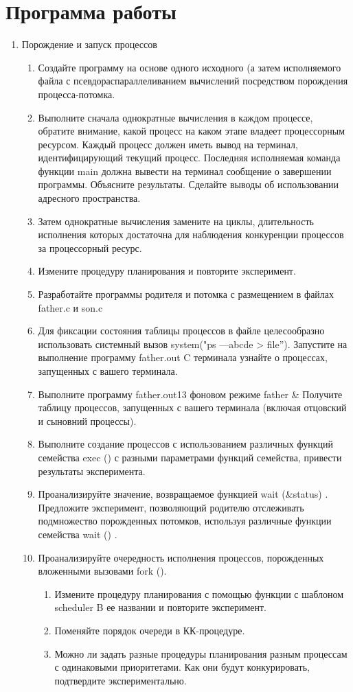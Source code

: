 \documentclass[a4paper]{article}
\begin{document}
\section{Программа работы}
\begin{enumerate}
	\item Порождение и запуск процессов
	\begin{enumerate}
		\item Создайте программу на основе одного исходного (а затем исполняемого файла с псевдораспараллеливанием вычислений посредством порождения процесса-потомка.
		\item Выполните сначала однократные вычисления в каждом процессе, обратите внимание, какой процесс на каком этапе владеет процессорным ресурсом. Каждый процесс должен иметь вывод на терминал, идентифицирующий текущий процесс. Последняя исполняемая команда функции main должна вывести на терминал сообщение о завершении программы. Объясните результаты. Сделайте выводы об использовании адресного пространства.
		\item Затем однократные вычисления замените на циклы, длительность исполнения которых достаточна для наблюдения конкуренции процессов за процессорный ресурс.
		\item Измените процедуру планирования и повторите эксперимент.
		\item Разработайте программы родителя и потомка с размещением в файлах father.c и son.c
		\item Для фиксации состояния таблицы процессов в файле целесообразно использовать системный вызов system("ps —abcde > file”). Запустите на выполнение программу father.out C терминала узнайте о процессах, запущенных с вашего терминала.
		\item Выполните программу father.out13 фоновом режиме father \& Получите таблицу процессов, запущенных с вашего терминала (включая отцовский и сыновний процессы).
		\item Выполните создание процессов с использованием различных функций семейства exec () с разными параметрами функций семейства, привести результаты эксперимента.
		\item Проанализируйте значение, возвращаемое функцией wait (\&status) . Предложите эксперимент, позволяющий родителю отслеживать подмножество порожденных потомков, используя различные функции семейства wait () .
		\item Проанализируйте очередность исполнения процессов, порожденных вложенными вызовами fork ().
			\begin{enumerate}
			\item Измените процедуру планирования с помощью функции с шаблоном scheduler B ее названии и повторите эксперимент.
			\item Поменяйте порядок очереди в КК-процедуре.
			\item Можно ли задать разные процедуры планирования разным процессам с одинаковыми приоритетами. Как они будут конкурировать, подтвердите экспериментально.
		\end{enumerate}


\end{enumerate}
\end{enumerate}
\end{document}
